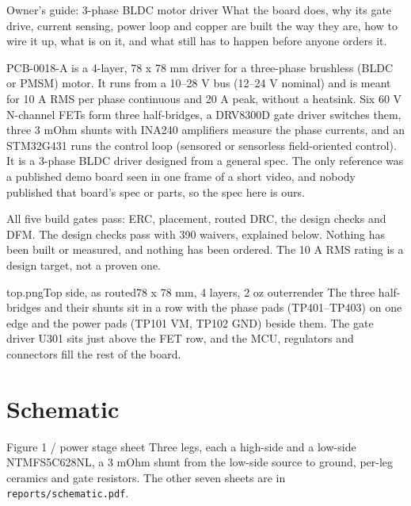 
\setlength{\tabcolsep}{4pt}


%
{Owner's guide: 3-phase BLDC motor driver}%
{What the board does, why its gate drive, current sensing, power loop and
copper are built the way they are, how to wire it up, what is on it, and what
still has to happen before anyone orders it.}

PCB-0018-A is a 4-layer, 78 x 78 mm driver for a three-phase brushless
(BLDC or PMSM) motor. It runs from a 10--28 V bus (12--24 V nominal) and is
meant for 10 A RMS per phase continuous and 20 A peak, without a heatsink. Six
60 V N-channel FETs form three half-bridges, a DRV8300D gate driver switches
them, three 3 mOhm shunts with INA240 amplifiers measure the phase currents, and
an STM32G431 runs the control loop (sensored or sensorless field-oriented
control). It is a 3-phase BLDC driver designed from a general spec. The only
reference was a published demo board seen in one frame of a short video, and
nobody published that board's spec or parts, so the spec here is ours.

All five build gates pass: ERC, placement, routed DRC, the design checks and
DFM. The design checks pass with 390 waivers, explained below. Nothing has been
built or measured, and nothing has been ordered. The 10 A RMS rating is a design
target, not a proven one.

\begin{hsplate}{top.png}{Top side, as routed}{78 x 78 mm, 4 layers, 2 oz outer}{render}%
{The three half-bridges and their shunts sit in a row with the phase pads
(TP401--TP403) on one edge and the power pads (TP101 VM, TP102 GND) beside them.
The gate driver U301 sits just above the FET row, and the MCU, regulators and
connectors fill the rest of the board.}
\end{hsplate}

\section{Schematic}

\begin{hsfigure}{Figure 1 / power stage sheet}%
{Three legs, each a high-side and a low-side NTMFS5C628NL, a 3 mOhm shunt
from the low-side source to ground, per-leg ceramics and gate resistors. The
other seven sheets are in \texttt{reports/schematic.pdf}.}
\end{hsfigure}

